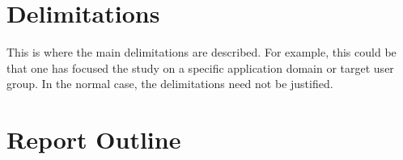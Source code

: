 

\section{Delimitations}
\label{sec:delimitations}

This is where the main delimitations are described. For
example, this could be that one has focused the study on a
specific application domain or target user group. In the
normal case, the delimitations need not be justified.

\section{Report Outline}
